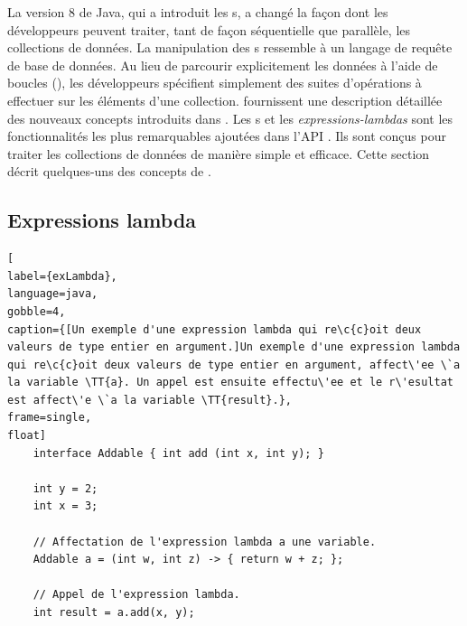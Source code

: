 La version 8 de Java, qui a introduit les s, a chang\'e la façon dont les d\'eveloppeurs peuvent traiter, tant de fa\c{c}on s\'equentielle que parall\`ele, les collections de donn\'ees. La manipulation des s ressemble \`a un langage de requ\^ete de base de donn\'ees. Au lieu de parcourir explicitement les donn\'ees \`a l'aide de boucles (), les d\'eveloppeurs sp\'ecifient simplement des suites d'op\'erations \`a effectuer sur les \'el\'ements d'une collection. \cite{urma2014java} fournissent une description d\'etaill\'ee des nouveaux concepts introduits dans . Les s et les \emph{expressions-lambdas} sont les fonctionnalit\'es les plus remarquables ajout\'ees dans l'API \citep{javaStreamAPI}. Ils sont con\c{c}us pour traiter les collections de donn\'ees de mani\`ere simple et efficace. Cette section d\'ecrit quelques-uns des concepts de .


\subsection{Expressions lambda}




\begin{lstlisting}[
label={exLambda},
language=java,
gobble=4,
caption={[Un exemple d'une expression lambda qui re\c{c}oit deux valeurs de type entier en argument.]Un exemple d'une expression lambda qui re\c{c}oit deux valeurs de type entier en argument, affect\'ee \`a la variable \TT{a}. Un appel est ensuite effectu\'ee et le r\'esultat est affect\'e \`a la variable \TT{result}.},
frame=single,
float]
    interface Addable { int add (int x, int y); }
    
    int y = 2;
    int x = 3;
    
    // Affectation de l'expression lambda a une variable.
    Addable a = (int w, int z) -> { return w + z; };

    // Appel de l'expression lambda.
    int result = a.add(x, y);    
\end{lstlisting}



